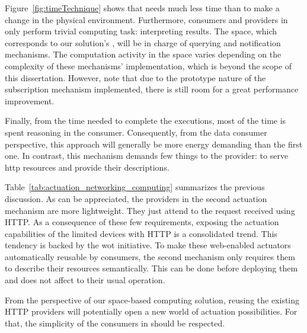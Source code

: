 
Figure~\ref{fig:timeTechnique} shows that \spaceActuation{} needs much less time than \restActuation{} to make a change in the physical environment.
Furthermore, consumers and providers in \spaceActuation{} only perform trivial computing task: interpreting results. %
The space, which corresponds to our solution's \coordspace{}, will be in charge of querying and notification mechanisms.
The computation activity in the space varies depending on the complexity of these mechanisms' implementation, which is beyond the scope of this dissertation.
However, note that due to the prototype nature of the subscription mechanism implemented, there is still room for a great performance improvement. %


Finally, from the time needed to complete the \restActuation{} executions, most of the time is spent reasoning in the consumer.
Consequently, from the data consumer perspective, this approach will generally be more energy demanding than the first one. %
In contrast, this mechanism demands few things to the provider: to serve \ac{http} resources and provide their descriptions. %


\bigskip





Table~\ref{tab:actuation_networking_computing} summarizes the previous discussion.
As can be appreciated, the providers in the second actuation mechanism are more lightweight.
They just attend to the request received using HTTP.
As a consequence of these few requirements, exposing the actuation capabilities of the limited devices with HTTP is a consolidated trend.
This tendency is backed by the \ac{wot} initiative.
To make these web-enabled actuators automatically reusable by consumers, the second mechanism only requires them to describe their resources semantically.
This can be done before deploying them and does not affect to their usual operation.


From the perspective of our space-based computing solution, reusing the existing HTTP providers will potentially open a new world of actuation possibilities.
For that, the simplicity of the consumers in \spaceActuation{} should be respected. %


